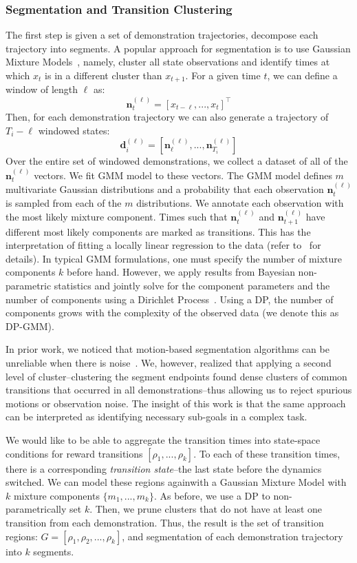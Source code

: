 \subsubsection{Segmentation and Transition Clustering}
The first step is given a set of demonstration trajectories, decompose each trajectory into segments.
A popular approach for segmentation is to use Gaussian Mixture Models~\cite{calinon2014skills}, namely, cluster all state observations and identify times at which $x_t$ is in a different cluster than $x_{t+1}$.
For a given time $t$, we can define a window of length $\ell$ as:
\[
\mathbf{n}^{(\ell)}_t = [x_{t-\ell},...,x_{t}]^\intercal
\]
Then, for each demonstration trajectory we can also generate a trajectory of $T_i - \ell$ windowed states:
\[
\mathbf{d}^{(\ell)}_i = [\mathbf{n}^{(\ell)}_\ell,...,\mathbf{n}^{(\ell)}_{T_i}]
\]
Over the entire set of windowed demonstrations, we collect a dataset of all of the $\mathbf{n}^{(\ell)}_t$ vectors.
We fit GMM model to these vectors.
The GMM model defines $m$ multivariate Gaussian distributions and a probability that each observation $\mathbf{n}^{(\ell)}_t$ is sampled from each of the $m$ distributions.
We annotate each observation with the most likely mixture component.
Times such that $\mathbf{n}^{(\ell)}_t$ and $\mathbf{n}^{(\ell)}_{t+1}$ have different most likely components are marked as transitions.
This has the interpretation of fitting a locally linear regression to the data (refer to~\cite{moldovan2013dirichlet, khansari2011learning, kruger2010learning, krishnan2015tsc,murali2016} for details).
In typical GMM formulations, one must specify the number of mixture components $k$ before hand.
However, we apply results from Bayesian non-parametric statistics and jointly solve for the component parameters and the number of components using a Dirichlet Process~\cite{kulis2011revisiting}.
Using a DP, the number of components grows with the complexity of the observed data (we denote this as DP-GMM).


In prior work, we noticed that motion-based segmentation algorithms can be unreliable when there is noise~\cite{krishnan2015tsc}.
We, however, realized that applying a second level of cluster--clustering the segment endpoints found dense clusters of common transitions that occurred in all demonstrations--thus allowing us to reject spurious motions or observation noise.
The insight of this work is that the same approach can be interpreted as identifying necessary sub-goals in a complex task.

We would like to be able to aggregate the transition times into state-space conditions for reward transitions $[\rho_1,...,\rho_k]$.
To each of these transition times, there is a corresponding \emph{transition state}--the last state before the dynamics switched.
We can model these regions againwith a Gaussian Mixture Model with $k$ mixture components $\{m_1,...,m_k\}$.
As before, we use a DP to non-parametrically set $k$.
Then, we prune clusters that do not have at least one transition from each demonstration.
Thus, the result is the set of transition regions: $G = [\rho_1, \rho_2,...,\rho_k]$, and segmentation of each demonstration trajectory into $k$ segments.


